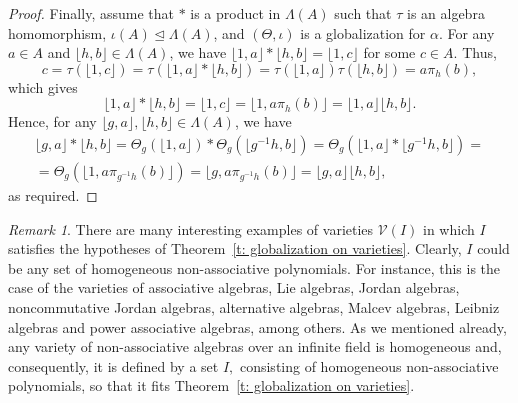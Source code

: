\documentclass[11pt]{amsart}
\numberwithin{equation}{section}
\theoremstyle{definition}
\theoremstyle{remark}
\newtheorem{remark}[theorem]{Remark}
\begin{document}
\begin{proof}
    Finally, assume that $*$ is a product in $\Lambda(A)$ such that $\tau$ is an algebra homomorphism, $\iota(A) \unlhd \Lambda(A)$, and $(\Theta, \iota)$ is a globalization for $\alpha$. For any $a \in A$ and $\lfloor h, b \rfloor \in \Lambda(A)$, we have $\lfloor 1, a \rfloor * \lfloor h, b \rfloor = \lfloor 1, c \rfloor$ for some $c \in A$. Thus,
    $$ c = \tau(\lfloor 1, c \rfloor) = \tau(\lfloor 1, a \rfloor * \lfloor h, b \rfloor) = \tau(\lfloor 1, a \rfloor) \tau(\lfloor h, b \rfloor) = a \pi_h(b), $$
    which gives
    $$ \lfloor 1, a \rfloor * \lfloor h, b \rfloor = \lfloor 1, c \rfloor = \lfloor 1, a \pi_h(b) \rfloor = \lfloor 1, a \rfloor \lfloor h, b \rfloor. $$ Hence, for any $\lfloor g, a \rfloor, \lfloor h, b \rfloor \in \Lambda(A)$, we have
    \begin{multline*}
        \lfloor g, a \rfloor * \lfloor h, b \rfloor = \Theta_g(\lfloor 1, a \rfloor) * \Theta_g(\lfloor g^{-1}h, b \rfloor) = \Theta_g(\lfloor 1, a \rfloor * \lfloor g^{-1}h, b \rfloor) = \\
        = \Theta_g(\lfloor 1, a \pi_{g^{-1}h}(b) \rfloor) = \lfloor g, a \pi_{g^{-1}h}(b) \rfloor = \lfloor g, a \rfloor \lfloor h, b \rfloor,
    \end{multline*}
    as required.
\end{proof}

\begin{remark}
    There are many interesting examples of varieties $\mathcal{V}(I)$ in which $I$ satisfies the hypotheses of Theorem~\ref{t: globalization on varieties}.  Clearly, $I$ could be any set of homogeneous non-associative polynomials. For instance, this is the case of the varieties of associative algebras, Lie algebras, Jordan algebras, noncommutative Jordan algebras, alternative algebras, Malcev algebras,  Leibniz algebras and  power associative algebras,  among others.  As we mentioned already, any variety of non-associative algebras over an infinite field is homogeneous and, consequently, it is defined by a set $I,$ consisting of homogeneous non-associative polynomials, so that it fits Theorem~\ref{t: globalization on varieties}.
\end{remark}
\end{document}
